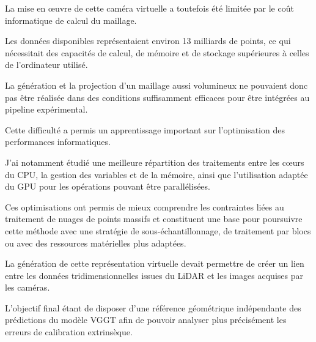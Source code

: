 \documentclass[12pt,a4paper,oneside]{report}
\begin{document}
\vspace{1cm}

\hspace*{1cm}La mise en œuvre de cette caméra virtuelle a toutefois été limitée par le coût informatique de calcul du maillage.\vspace{0.05cm}

\hspace*{0.5cm}Les données disponibles représentaient environ 13 milliards de points, ce qui nécessitait des capacités de calcul, de mémoire et de stockage supérieures à celles de l'ordinateur utilisé. \vspace{0.05cm}

\hspace*{0.5cm}La génération et la projection d'un maillage aussi volumineux ne pouvaient donc pas être réalisée dans des conditions suffisamment efficaces pour être intégrées au pipeline expérimental.

\newpage

\hspace*{1cm}Cette difficulté a permis un apprentissage important sur l'optimisation des performances informatiques.\vspace{0.05cm}

\hspace*{0.5cm}J'ai notamment étudié une meilleure répartition des traitements entre les cœurs du CPU, la gestion des variables et de la mémoire, ainsi que l'utilisation adaptée du GPU pour les opérations pouvant être parallélisées. \vspace{0.05cm}

\hspace*{0.5cm}Ces optimisations ont permis de mieux comprendre les contraintes liées au traitement de nuages de points massifs et constituent une base pour poursuivre cette méthode avec une stratégie de sous-échantillonnage, de traitement par blocs ou avec des ressources matérielles plus adaptées.\vspace{0.2cm}

\hspace*{1cm}La génération de cette représentation virtuelle devait permettre de créer un lien entre les données tridimensionnelles issues du LiDAR et les images acquises par les caméras.\vspace{0.05cm}

\hspace*{0.5cm}L'objectif final étant de disposer d'une référence géométrique indépendante des prédictions du modèle VGGT afin de pouvoir analyser plus précisément les erreurs de calibration extrinsèque.\vspace{0.1cm}
\end{document}
